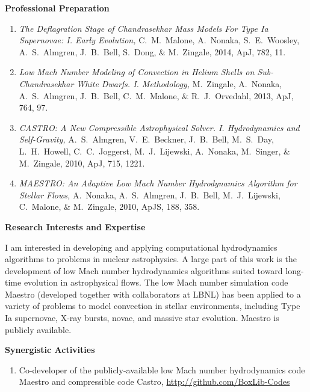 \documentclass[11pt,letterpaper,english]{article}
\begin{document}
\begin{flushleft} {\bf Professional Preparation}
\begin{enumerate}
\item {\it The Deflagration Stage of Chandrasekhar Mass Models For
  Type Ia Supernovae: I. Early Evolution, } C.~M.~Malone, A.~Nonaka,
  S.~E.~Woosley, A.~S.~Almgren, J.~B.~Bell, S.~Dong, \& M.~Zingale,
  2014, ApJ, 782, 11.

\item {\it Low Mach Number Modeling of Convection in Helium Shells on
  Sub-Chandrasekhar White Dwarfs. I. Methodology,} M.~Zingale,
  A.~Nonaka, A.~S.~Almgren, J.~B.~Bell, C.~M.~Malone, \&
  R.~J.~Orvedahl, 2013, ApJ, 764, 97.

\item {\it CASTRO: A New Compressible Astrophysical
  Solver. I. Hydrodynamics and Self-Gravity,} A.~S.~Almgren,
  V.~E.~Beckner, J.~B.~Bell, M.~S.~Day, L.~H.~Howell, C.~C.~Joggerst,
  M.~J.~Lijewski, A.~Nonaka, M.~Singer, \& M.~Zingale, 2010, ApJ, 715,
  1221.

\item {\it MAESTRO: An Adaptive Low Mach Number Hydrodynamics
  Algorithm for Stellar Flows,} A.~Nonaka, A.~S.~Almgren, J.~B.~Bell,
  M.~J.~Lijewski, C.~Malone, \& M.~Zingale, 2010, ApJS, 188, 358.

\end{enumerate} 

\vspace{-6pt}
{\bf Research Interests and Expertise}
{\parindent 16pt

I am interested in developing and
  applying computational hydrodynamics algorithms to problems in
  nuclear astrophysics.  A large part of this work is the development
  of low Mach number hydrodynamics algorithms suited toward long-time
  evolution in astrophysical flows.  The low Mach number simulation
  code Maestro (developed together with collaborators at LBNL) has
  been applied to a variety of problems to model convection in stellar
  environments, including Type Ia supernovae, X-ray bursts, novae,
  and massive star evolution.  Maestro is publicly available.

}

\vspace{.04in}
{\bf Synergistic Activities}
\vspace{-6pt}
\begin{enumerate} \itemsep1pt \parskip0pt 
\item Co-developer of the publicly-available low Mach number
  hydrodynamics code Maestro and compressible code Castro,
  \url{http://github.com/BoxLib-Codes} \\


\end{enumerate}
\end{flushleft}
\end{document}
